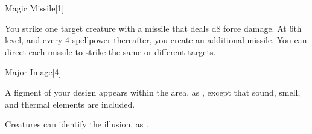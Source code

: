 \begin{spellsection}{Magic Missile}[1]
    \begin{spellheader}
    \end{spellheader}
    \begin{spellcontent}
        \begin{spelltargetinginfo}
        \end{spelltargetinginfo}
        \begin{spelleffects}
            \spelleffect You strike one target creature with a missile that deals d8 force damage. At 6th level, and every 4 spellpower thereafter, you create an additional missile. You can direct each missile to strike the same or different targets.
        \end{spelleffects}
    \end{spellcontent}
    \begin{spellfooter}
        \spellnotes \forcespellnotes
        \miscastrandom
    \end{spellfooter}
\end{spellsection}

\begin{spellsection}{Major Image}[4]
    \begin{spellheader}
    \end{spellheader}
    \begin{spellcontent}
        \begin{spelltargetinginfo}
        \end{spelltargetinginfo}
        \begin{spelleffects}
            \spelleffect A figment of your design appears within the area, as , except that sound, smell, and thermal elements are included.
            \spelldur \durshort
        \end{spelleffects}
    \end{spellcontent}
    \begin{spellfooter}
        \spellnotes Creatures can identify the illusion, as .
        \miscastexplode
    \end{spellfooter}
\end{spellsection}

